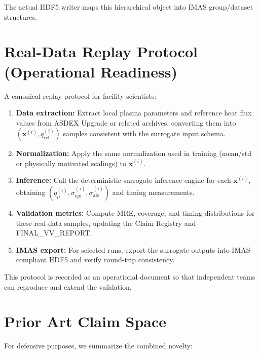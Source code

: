 \documentclass[11pt]{article}
\begin{document}
The actual HDF5 writer maps this hierarchical object into IMAS group/dataset structures.

\section{Real-Data Replay Protocol (Operational Readiness)}

A canonical replay protocol for facility scientists:

\begin{enumerate}[label=(\arabic*)]
  \item \textbf{Data extraction:}  
    Extract local plasma parameters and reference heat flux values from ASDEX Upgrade or related archives, converting them into $(\bm{x}^{(i)}, q_\mathrm{ref}^{(i)})$ samples consistent with the surrogate input schema.

  \item \textbf{Normalization:}  
    Apply the same normalization used in training (mean/std or physically motivated scalings) to $\bm{x}^{(i)}$.

  \item \textbf{Inference:}  
    Call the deterministic surrogate inference engine for each $\bm{x}^{(i)}$, obtaining $(q_\mu^{(i)}, \sigma_{\mathrm{epi}}^{(i)}, \sigma_{\mathrm{ale}}^{(i)})$ and timing measurements.

  \item \textbf{Validation metrics:}  
    Compute MRE, coverage, and timing distributions for these real-data samples, updating the Claim Registry and FINAL\_VV\_REPORT.

  \item \textbf{IMAS export:}  
    For selected runs, export the surrogate outputs into IMAS-compliant HDF5 and verify round-trip consistency.

\end{enumerate}

This protocol is recorded as an operational document so that independent teams can reproduce and extend the validation.

\section{Prior Art Claim Space}

For defensive purposes, we summarize the combined novelty:
\end{document}
